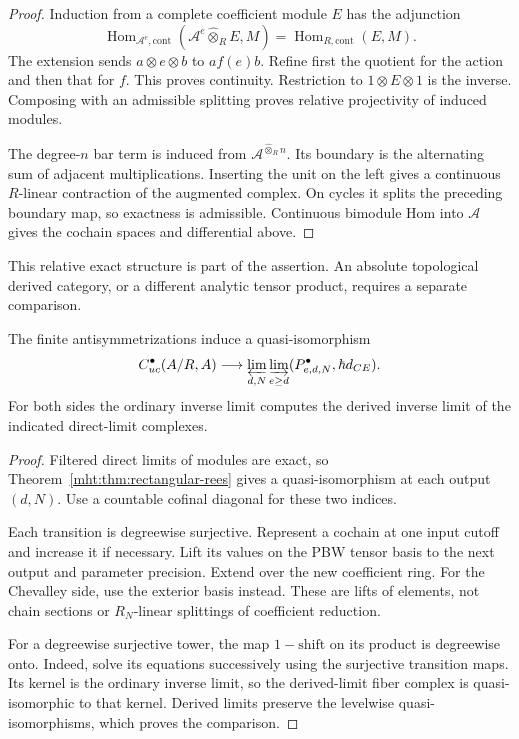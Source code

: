 \begin{proof}
Induction from a complete coefficient module $E$ has the
adjunction
\[
 \operatorname{Hom}_{\mathcal A^e,\mathrm{cont}}
       (\mathcal A^e\widehat\otimes_RE,M)
 =\operatorname{Hom}_{R,\mathrm{cont}}(E,M).
\]
The extension sends $a\otimes e\otimes b$ to $a f(e)b$.
Refine first the quotient for the action and then that for $f$.
This proves continuity. Restriction to $1\otimes E\otimes1$
is the inverse. Composing with an admissible splitting proves
relative projectivity of induced modules.

The degree-$n$ bar term is induced from
$\mathcal A^{\widehat\otimes_Rn}$. Its boundary is the alternating
sum of adjacent multiplications. Inserting the unit on the left
gives a continuous $R$-linear contraction of the augmented complex.
On cycles it splits the preceding boundary map, so exactness is
admissible. Continuous bimodule Hom into $\mathcal A$ gives the
cochain spaces and differential above.
\end{proof}

This relative exact structure is part of the assertion.
An absolute topological derived category, or a different analytic
tensor product, requires a separate comparison.

\begin{theorem}\label{mht:thm:continuous-rees}
The finite antisymmetrizations induce a quasi-isomorphism
\[
 C^\bullet_{\mathrm{uc}}(\mathcal A/R,\mathcal A)
 \longrightarrow
 \varprojlim_{d,N}\varinjlim_{e\geq d}
             (P^\bullet_{e,d,N},\hbar d_{\mathrm{CE}}).
\]
For both sides the ordinary inverse limit computes the derived
inverse limit of the indicated direct-limit complexes.
\end{theorem}

\begin{proof}
Filtered direct limits of modules are exact, so
Theorem~\ref{mht:thm:rectangular-rees} gives a quasi-isomorphism
at each output $(d,N)$. Use a countable cofinal diagonal for
these two indices.

Each transition is degreewise surjective. Represent a cochain at
one input cutoff and increase it if necessary. Lift its values
on the PBW tensor basis to the next output and parameter precision.
Extend over the new coefficient ring. For the Chevalley side,
use the exterior basis instead. These are lifts of elements,
not chain sections or $R_N$-linear splittings of coefficient
reduction.

For a degreewise surjective tower, the map
$1-\mathrm{shift}$ on its product is degreewise onto.
Indeed, solve its equations successively using the surjective
transition maps. Its kernel is the ordinary inverse limit, so
the derived-limit fiber complex is quasi-isomorphic to that
kernel. Derived limits preserve the levelwise quasi-isomorphisms,
which proves the comparison.
\end{proof}

